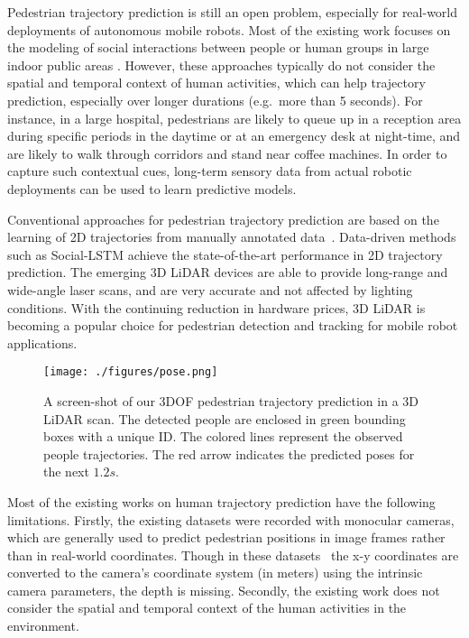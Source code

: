 \documentclass[letterpaper, 10 pt, conference]{ieeeconf}  %
\begin{document}
Pedestrian trajectory prediction is still an open problem, especially for real-world deployments of autonomous mobile robots.
Most of the existing work focuses on the modeling of social interactions between people or human groups in large indoor public areas \cite{helbing1995social,UCY,ETH,IGP,yamaguchi2011you,linder2014multi,social-lstm,context-lstm}.
However, these approaches typically do not consider the spatial and temporal context of human activities, which can help trajectory prediction, especially over longer durations (e.g.~more than 5 seconds).
For instance, in a large hospital, pedestrians are likely to queue up in a reception area during specific periods in the daytime or at an emergency desk at night-time, and are likely to walk through corridors and stand near coffee machines.
In order to capture such contextual cues, long-term sensory data from actual robotic deployments can be used to learn predictive models.


Conventional approaches for pedestrian trajectory prediction are based on the learning of 2D trajectories from manually annotated data~\cite{UCY,ETH,IGP,yamaguchi2011you,social-lstm,context-lstm,SDD}.
Data-driven methods such as Social-LSTM \cite{social-lstm} achieve the state-of-the-art performance in 2D trajectory prediction.
The emerging 3D LiDAR devices are able to provide long-range and wide-angle laser scans, and are very accurate and not affected by lighting conditions.
With the continuing reduction in hardware prices, 3D LiDAR is becoming a popular choice for pedestrian detection and tracking for mobile robot applications.

\begin{figure}[t]
\centering
\texttt{[image: ./figures/pose.png]}
\caption{A screen-shot of our 3DOF pedestrian trajectory prediction in a 3D LiDAR scan. The detected people are enclosed in green bounding boxes with a unique ID.
The colored lines represent the observed people trajectories.
The red arrow indicates the predicted poses for the next $1.2s$.}
\label{fig:pose_example}
\end{figure}

Most of the existing works on human trajectory prediction have the following limitations.
Firstly, the existing datasets were recorded with monocular cameras, which are generally used to predict pedestrian positions in image frames rather than in real-world coordinates.
Though in these datasets~\cite{UCY,ETH,SDD} the x-y coordinates are converted to the camera's coordinate system (in meters) using the intrinsic camera parameters, the depth is missing.
Secondly, the existing work does not consider the spatial and temporal context of the human activities in the environment.
\end{document}
